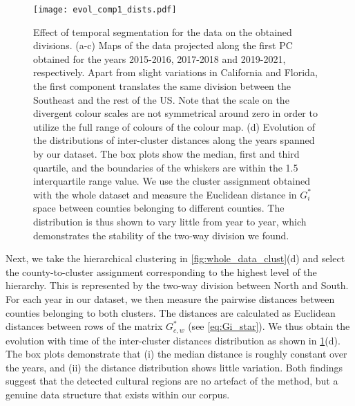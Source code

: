 \documentclass[../thesis.tex]{subfiles}
\begin{document}
\begin{figure}[ht!]
\centering
  \texttt{[image: evol\_comp1\_dists.pdf]}
  \caption{Effect of temporal segmentation for the data on the obtained divisions. (a-c)
  Maps of the data projected along the first \ac{PC} obtained for the years 2015-2016,
  2017-2018 and 2019-2021, respectively. Apart from slight variations in California and
  Florida, the first component translates the same division between the Southeast and
  the rest of the US. Note that the scale on the divergent colour scales are not
  symmetrical around zero in order to utilize the full range of colours of the colour map.
  (d) Evolution of the distributions of inter-cluster distances along the years spanned
  by our dataset. The box plots show the median, first and third quartile, and the
  boundaries of the whiskers are within the 1.5 interquartile range value. We use the
  cluster assignment obtained with the whole dataset and measure the Euclidean distance
  in $G_i^*$ space between counties belonging to different counties. The distribution is
  thus shown to vary little from year to year,  which demonstrates the stability of the
  two-way division we found.}
  \label{fig:evol_comp1_dists}
\end{figure}

Next, we take the hierarchical clustering in \cref{fig:whole_data_clust}(d) and select
the county-to-cluster assignment corresponding to the highest level of the hierarchy.
This is represented by the two-way division between North and South. For each year in
our dataset, we then measure the pairwise distances between counties belonging to both
clusters. The distances are calculated as Euclidean distances between rows of the matrix
$G_{c, w}^*$ (see \cref{eq:Gi_star}). We thus obtain the evolution with time of the
inter-cluster distances distribution as shown in \cref{fig:evol_comp1_dists}(d). The box
plots demonstrate that (i) the median distance is roughly constant over the years, and
(ii) the distance distribution shows little variation. Both findings suggest that the
detected cultural regions are no artefact of the method, but a genuine data structure
that exists within our corpus.
\end{document}
